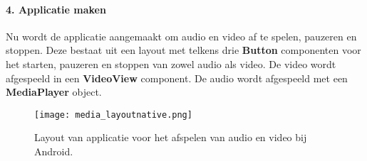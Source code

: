 \paragraph{4. Applicatie maken}
Nu wordt de applicatie aangemaakt om audio en video af te spelen, pauzeren en
stoppen. Deze bestaat uit een layout met telkens drie \textbf{Button} componenten 
voor het starten, pauzeren en stoppen van zowel audio als video. De video 
wordt afgespeeld in een \textbf{VideoView} component. De audio wordt afgespeeld
met een \textbf{MediaPlayer} object.
\begin{figure}[H]
    \centering
    \texttt{[image: media\_layoutnative.png]}
    \caption{Layout van applicatie voor het afspelen van audio en video bij Android.}
\end{figure}





